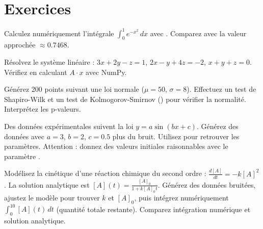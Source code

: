 \section{Exercices}

\begin{exercice}[$\star$]
Calculez num\'eriquement l'int\'egrale $\displaystyle\int_0^1 e^{-x^2}\,dx$ avec
. Comparez avec la valeur approch\'ee $\approx 0.7468$.
\end{exercice}

\begin{exercice}[$\star$]
R\'esolvez le syst\`eme lin\'eaire :
$3x + 2y - z = 1$, $2x - y + 4z = -2$, $x + y + z = 0$.
V\'erifiez en calculant $A \cdot x$ avec NumPy.
\end{exercice}

\begin{exercice}[$\star\star$]
G\'en\'erez 200 points suivant une loi normale ($\mu = 50$, $\sigma = 8$).
Effectuez un test de Shapiro-Wilk et un test de Kolmogorov-Smirnov
() pour v\'erifier la normalit\'e. Interpr\'etez les p-valeurs.
\end{exercice}

\begin{exercice}[$\star\star$]
Des donn\'ees exp\'erimentales suivent la loi $y = a \sin(bx + c)$.
G\'en\'erez des donn\'ees avec $a=3$, $b=2$, $c=0.5$ plus du bruit.
Utilisez  pour retrouver les param\`etres. Attention : donnez
des valeurs initiales raisonnables avec le param\`etre .
\end{exercice}

\begin{exercice}[$\star\star\star$]
Mod\'elisez la cin\'etique d'une r\'eaction chimique du second ordre :
$\frac{d[A]}{dt} = -k[A]^2$. La solution analytique est
$[A](t) = \frac{[A]_0}{1 + k[A]_0 t}$. G\'en\'erez des donn\'ees bruit\'ees,
ajustez le mod\`ele pour trouver $k$ et $[A]_0$, puis int\'egrez num\'eriquement
$\int_0^{10} [A](t)\,dt$ (quantit\'e totale restante). Comparez int\'egration
num\'erique et solution analytique.
\end{exercice}

